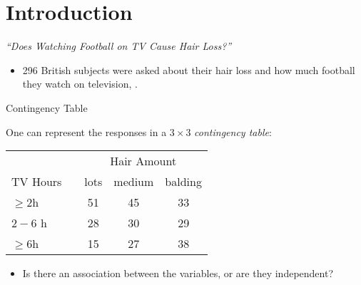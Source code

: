 \section{Introduction}

\begin{frame}{\emph{``Does Watching Football on TV Cause Hair Loss?''}}
    
    \begin{itemize}
        \item 296 British subjects were asked about their hair loss and how much football they watch on television, \cite{DMJSDS2003}.
    \end{itemize}

    \begin{block}{Contingency Table}

    One can represent the responses in a $3\times 3$ \emph{contingency table}:

    \begin{table}[h]
    \vspace{12pt}
        \begin{tabular}{@{}lcccc@{}} 
        & &  \multicolumn{3}{c}{Hair Amount}\\\cmidrule{3-5} 
        TV Hours & & lots & medium & balding\\ \midrule 
        $\geq 2$h & & 51 & 45 & 33 \\ 
        $2-6$ h & & 28 & 30 & 29 \\ 
        $\geq 6$h & & 15 & 27 & 38\\\bottomrule
        \end{tabular}
    \end{table} 
    \end{block}

    \begin{itemize}
        \item Is there an association between the variables, or are they independent?
    \end{itemize}

\end{frame}

